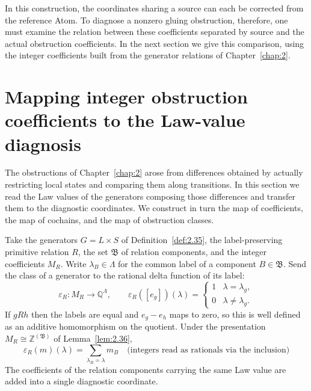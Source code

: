 In this construction, the coordinates sharing a source can each be corrected from
the reference Atom.
To diagnose a nonzero gluing obstruction, therefore, one must examine the relation
between these coefficients separated by source and the actual obstruction
coefficients.
In the next section we give this comparison, using the integer coefficients built
from the generator relations of Chapter~\ref{chap:2}.

\section{Mapping integer obstruction coefficients to the Law-value diagnosis}\label{sec:3.9}

The obstructions of Chapter~\ref{chap:2} arose from differences obtained by actually
restricting local states and comparing them along transitions.
In this section we read the Law values of the generators composing those
differences and transfer them to the diagnostic coordinates.
We construct in turn the map of coefficients, the map of cochains, and the map of
obstruction classes.

\begin{construction}\label{cons:3.33}

Take the generators $G=L\times S$ of Definition~\ref{def:2.35}, the label-preserving
primitive relation $R$, the set $\mathfrak{B}$ of relation components, and the
integer coefficients $M_R$.
Write $\lambda_B\in\Lambda$ for the common label of a component $B\in\mathfrak{B}$.
Send the class of a generator to the rational delta function of its label:
\begin{equation*}
\varepsilon_R:M_R\longrightarrow \mathbb{Q}^\Lambda,\qquad
\varepsilon_R([e_g])(\lambda)
=\begin{cases}
1&\lambda=\lambda_g,\\
0&\lambda\ne\lambda_g.
\end{cases}
\tag{3.26}\label{eq:3.26}
\end{equation*}
If $gRh$ then the labels are equal and $e_g-e_h$ maps to zero, so this is well
defined as an additive homomorphism on the quotient.
Under the presentation $M_R\cong\mathbb{Z}^{(\mathfrak{B})}$ of
Lemma~\ref{lem:2.36},
\begin{equation*}
\varepsilon_R(m)(\lambda)
=\sum_{\lambda_B=\lambda}m_B
\quad\text{(integers read as rationals via the inclusion)}
\tag{3.27}\label{eq:3.27}
\end{equation*}
The coefficients of the relation components carrying the same Law value are added
into a single diagnostic coordinate.

\end{construction}

